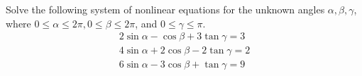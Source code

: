 \begin{problem}
Solve the following system of nonlinear equations for the unknown angles $\alpha, \beta, \gamma$, where 
$0 \leq \alpha \leq 2\pi, 0 \leq \beta \leq 2\pi$, and $0 \leq \gamma \leq \pi$.
\begin{align*}
2\sin\alpha - \cos\beta + 3\tan\gamma = 3 \\
4\sin\alpha + 2\cos\beta - 2\tan\gamma = 2 \\
6\sin\alpha - 3\cos\beta + \tan\gamma = 9
\end{align*}
\end{problem}